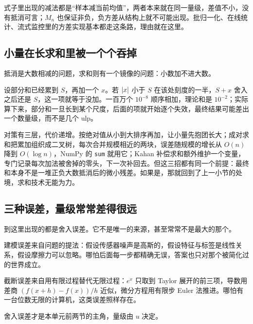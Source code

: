 式子里出现的减法都是``样本减当前均值''，两者本来就在同一量级，差值不小，没有抵消可言；\(M_n\) 也保证非负，负方差从结构上就不可能出现。批归一化、在线统计、流式监控里的方差实现基本都走这条路，理由就在这里。

\subsection{小量在长求和里被一个个吞掉}

抵消是大数相减的问题，求和则有一个镜像的问题：小数加不进大数。

设部分和已经累到 \(S\)，再加一个 \(x\)。若 \(\left|x\right|\) 小于 \(S\) 在该处刻度的一半，\(S+x\) 舍入之后还是 \(S\)，这一项就等于没加。一百万个 \(10^{-8}\) 顺序相加，理论和是 \(10^{-2}\)；实际算下来，部分和一旦长到某个尺度，后面的项就开始逐个失效，最终结果可能差出一个数量级，而不是几个 ulp。

对策有三层，代价递增。按绝对值从小到大排序再加，让小量先抱团长大；成对求和把累加组织成二叉树，每次合并规模相近的两块，误差随规模的增长从 \(O(n)\) 降到 \(O(\log n)\)，NumPy 的 \texttt{sum} 就用它；Kahan 补偿求和额外维护一个变量，专门记录每次加法被舍掉的零头，下一次补回去。但这三招都有同一个前提：最终和本身不是一堆正负大数抵消后的微小残差。如果是，那就回到了上一小节的处境，求和技术无能为力。

\subsection{三种误差，量级常常差得很远}

到这里出现的都是舍入误差。它不是唯一的来源，甚至常常不是最大的那个。

建模误差来自问题的提法：假设传感器噪声是高斯的，假设特征与标签是线性关系，假设摩擦力可以忽略。哪怕后面每一步都精确无误，答案也只对那个被简化过的世界成立。

截断误差来自用有限过程替代无限过程：\(e^x\) 只取到 Taylor 展开的前三项，导数用差商 \((f(x+h)-f(x))/h\) 近似，微分方程用有限步 Euler 法推进。哪怕有一台位数无限的计算机，这类误差照样存在。

舍入误差才是本单元前两节的主角，量级由 \(u\) 决定。


